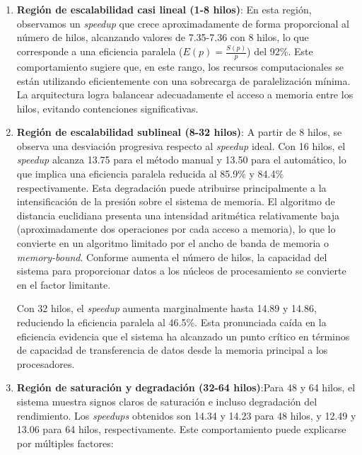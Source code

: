         \begin{enumerate}
        
            \item \textbf{Región de escalabilidad casi lineal (1-8 hilos)}: En esta región, observamos un \textit{speedup} que crece aproximadamente de forma proporcional al número de hilos, alcanzando valores de 7.35-7.36 con 8 hilos, lo que corresponde a una eficiencia paralela ($E(p) = \frac{S(p)}{p}$) del 92\%. Este comportamiento sugiere que, en este rango, los recursos computacionales se están utilizando eficientemente con una sobrecarga de paralelización mínima. La arquitectura logra balancear adecuadamente el acceso a memoria entre los hilos, evitando contenciones significativas.

            \item \textbf{Región de escalabilidad sublineal (8-32 hilos)}: A partir de 8 hilos, se observa una desviación progresiva respecto al \textit{speedup} ideal. Con 16 hilos, el \textit{speedup} alcanza 13.75 para el método manual y 13.50 para el automático, lo que implica una eficiencia paralela reducida al 85.9\% y 84.4\% respectivamente. Esta degradación puede atribuirse principalmente a la intensificación de la presión sobre el sistema de memoria. El algoritmo de distancia euclidiana presenta una intensidad aritmética relativamente baja (aproximadamente dos operaciones por cada acceso a memoria), lo que lo convierte en un algoritmo limitado por el ancho de banda de memoria o \textit{memory-bound}. Conforme aumenta el número de hilos, la capacidad del sistema para proporcionar datos a los núcleos de procesamiento se convierte en el factor limitante.

            Con 32 hilos, el \textit{speedup} aumenta marginalmente hasta 14.89 y 14.86, reduciendo la eficiencia paralela al 46.5\%. Esta pronunciada caída en la eficiencia evidencia que el sistema ha alcanzado un punto crítico en términos de capacidad de transferencia de datos desde la memoria principal a los procesadores.

            \item \textbf{Región de saturación y degradación (32-64 hilos)}:Para 48 y 64 hilos, el sistema muestra signos claros de saturación e incluso degradación del rendimiento. Los \textit{speedups} obtenidos son 14.34 y 14.23 para 48 hilos, y 12.49 y 13.06 para 64 hilos, respectivamente. Este comportamiento puede explicarse por múltiples factores:
                
                \begin{itemize}
                

\end{itemize}
\end{enumerate}
